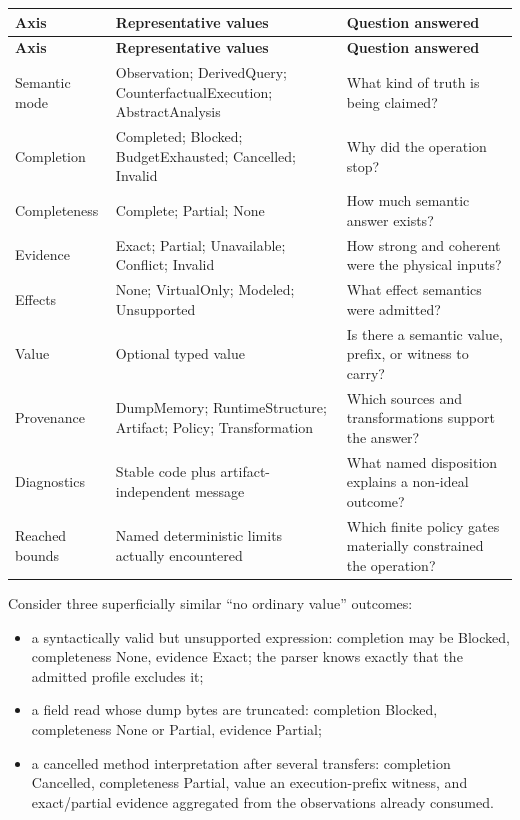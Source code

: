 \documentclass[11pt,oneside,openany]{book}
\newcommand{\status}[1]{\textsf{#1}}
\begin{document}
\begin{longtable}{L{33mm}L{42mm}L{70mm}}
\toprule
\textbf{Axis} & \textbf{Representative values} & \textbf{Question answered} \\
\midrule
\endfirsthead
\toprule
\textbf{Axis} & \textbf{Representative values} & \textbf{Question answered} \\
\midrule
\endhead
Semantic mode & Observation; DerivedQuery; CounterfactualExecution; AbstractAnalysis & What kind of truth is being claimed? \\
Completion & Completed; Blocked; BudgetExhausted; Cancelled; Invalid & Why did the operation stop? \\
Completeness & Complete; Partial; None & How much semantic answer exists? \\
Evidence & Exact; Partial; Unavailable; Conflict; Invalid & How strong and coherent were the physical inputs? \\
Effects & None; VirtualOnly; Modeled; Unsupported & What effect semantics were admitted? \\
Value & Optional typed value & Is there a semantic value, prefix, or witness to carry? \\
Provenance & DumpMemory; RuntimeStructure; Artifact; Policy; Transformation & Which sources and transformations support the answer? \\
Diagnostics & Stable code plus artifact-independent message & What named disposition explains a non-ideal outcome? \\
Reached bounds & Named deterministic limits actually encountered & Which finite policy gates materially constrained the operation? \\
\bottomrule
\end{longtable}

Consider three superficially similar ``no ordinary value'' outcomes:

\begin{itemize}
  \item a syntactically valid but unsupported expression: completion may be \status{Blocked}, completeness \status{None}, evidence \status{Exact}; the parser knows exactly that the admitted profile excludes it;
  \item a field read whose dump bytes are truncated: completion \status{Blocked}, completeness \status{None} or \status{Partial}, evidence \status{Partial};
  \item a cancelled method interpretation after several transfers: completion \status{Cancelled}, completeness \status{Partial}, value an execution-prefix witness, and exact/partial evidence aggregated from the observations already consumed.
\end{itemize}
\end{document}
